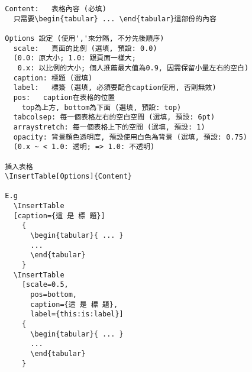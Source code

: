   \begin{DescriptionFrame}
  \begin{verbatim}
  Content:   表格內容 (必填)
    只需要\begin{tabular} ... \end{tabular}這部份的內容

  Options 設定 (使用','來分隔, 不分先後順序)
    scale:   頁面的比例 (選填, 預設: 0.0)
    (0.0: 原大小; 1.0: 跟頁面一樣大;
     0.x: 以比例的大小; 個人推薦最大值為0.9, 因需保留小量左右的空白)
    caption: 標題 (選填)
    label:   標簽 (選填, 必須要配合caption使用, 否則無效)
    pos:   caption在表格的位置
      top為上方, bottom為下面 (選填, 預設: top)
    tabcolsep: 每一個表格左右的空白空間 (選填, 預設: 6pt)
    arraystretch: 每一個表格上下的空間 (選填, 預設: 1)
    opacity: 背景顏色透明度, 預設使用白色為背景 (選填, 預設: 0.75)
    (0.x ~ < 1.0: 透明; => 1.0: 不透明)

  插入表格
  \InsertTable[Options]{Content}

  E.g
    \InsertTable
    [caption={這 是 標 題}]
      {
        \begin{tabular}{ ... }
        ...
        \end{tabular}
      }
    \InsertTable
      [scale=0.5,
        pos=bottom,
        caption={這 是 標 題},
        label={this:is:label}]
      {
        \begin{tabular}{ ... }
        ...
        \end{tabular}
      }
  \end{verbatim}
  \end{DescriptionFrame}


